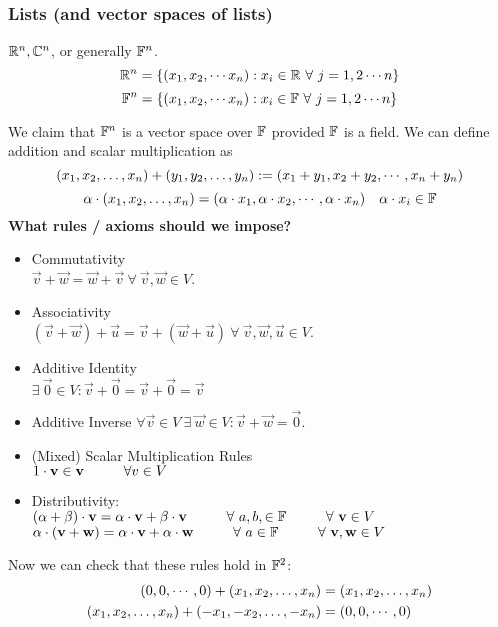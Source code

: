 \subsubsection*{Lists (and vector spaces of lists)}
\begin{example} 
$\mathbb R^n, \mathbb C^n$, or generally $\mathbb F^n$. 
\[ \mathbb R^{n} = \left\{ (x_1,x_2, \cdots x_n) : x_i \in \mathbb R \ \forall \ j = 1,2 \cdots n \right\} \]
\[ \mathbb F^{n} = \left\{ (x_1,x_2, \cdots x_n) : x_i \in \mathbb F \ \forall \ j = 1,2 \cdots n \right\} \]
\end{example}
\noindent We claim that $\mathbb F^n$ is a vector space over $\mathbb F$ provided $\mathbb F$ is a field. We can define addition and scalar multiplication as 
\[ ({x}_1,{x}_2, \ldots, {x}_{n}) + ({y}_1,{y}_2, \ldots, {y}_{n}) := (x_1 + y_1, x_2 + y_2, \cdots , x_n + y_n)\]
\[ \alpha \cdot ({x}_1,{x}_2, \ldots, {x}_{n}) =  ( \alpha \cdot x_1, \alpha \cdot x_2, \cdots, \alpha \cdot x_n)\ \ \ \alpha \cdot x_i \in \mathbb F\]
\textbf{What rules / axioms should we impose?}
\begin{itemize}
    \item Commutativity \\
    $\vec v + \vec w = \vec w + \vec v \ \forall \ \vec v,\vec w \in V$. 
    \item Associativity \\
    $(\vec v + \vec w) + \vec u = \vec v + (\vec w + \vec u) \ \forall \ \vec v, \vec w, \vec u \in V$. 
    \item Additive Identity \\
    $\exists \ \vec 0 \in V : \vec v + \vec 0 = \vec v + \vec 0 = \vec v$ 
    \item Additive Inverse
    $\forall \vec v \in V \ \exists \ \vec w \in V : \vec v + \vec w = \vec 0$.
    \item (Mixed) Scalar Multiplication Rules \\
    $1 \cdot \mathbf v \in \mathbf v \hspace{1cm} \forall v \in V$
    \item Distributivity:  \\
    $(\alpha + \beta ) \cdot \vec v = \alpha \cdot \vec v + \beta \cdot \vec v \tab \forall \ a,b, \in \b F \tab \forall \ \vec v \in V$ \\
    $\alpha \cdot (\vec v + \vec w) = \alpha \cdot \vec v + \alpha \cdot \vec w \tab \forall \ a \in \b F \tab \forall \ \vec v ,\vec w \in V$
\end{itemize}
Now we can check that these rules hold in $\mathbb F^2$:
\begin{align*}
    (0,0,\cdots,0) + ({x}_1,{x}_2, \ldots, {x}_{n}) &= ({x}_1,{x}_2, \ldots, {x}_{n}) \\
    ({x}_1,{x}_2, \ldots, {x}_{n}) + ({-x}_1,{-x}_2, \ldots, {-x}_{n}) &= (0,0,\cdots,0) 
\end{align*} \\

